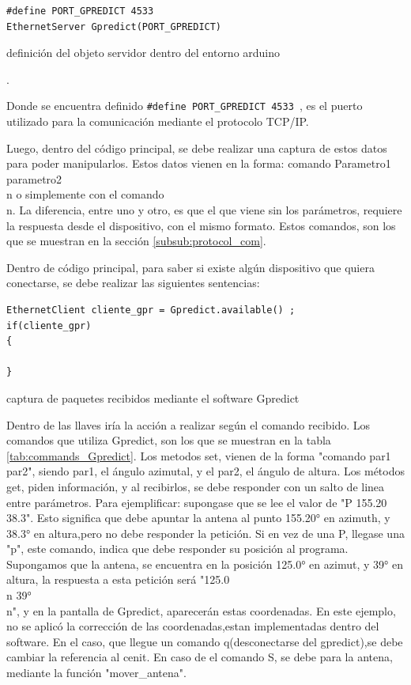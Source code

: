 \begin{listing}[H]
	\begin{verbatim}
#define PORT_GPREDICT 4533 
EthernetServer Gpredict(PORT_GPREDICT)
	\end{verbatim}
\caption{definición del objeto servidor dentro del entorno arduino}. 
\label{cod:obj_serv_gpr}
\end{listing}
Donde se encuentra definido \texttt{#define PORT_GPREDICT 4533 }, es el puerto utilizado para la comunicación mediante el protocolo TCP/IP.

Luego, dentro del código principal, se debe realizar una captura de estos datos para poder manipularlos. Estos datos vienen en la forma: 
comando Parametro1 parametro2\\n o simplemente con el comando \\n. La diferencia, entre uno y otro, es que el que viene sin los parámetros, requiere la respuesta desde el dispositivo, con el mismo formato. Estos comandos, son los que se muestran en la sección \ref{subsub:protocol_com}. 

Dentro de código principal, para saber si existe algún dispositivo que quiera conectarse, se debe realizar las siguientes sentencias: 

\begin{listing}[ht]
	\begin{verbatim}
EthernetClient cliente_gpr = Gpredict.available() ;
if(cliente_gpr)
{

}
	\end{verbatim}
\caption{captura de paquetes recibidos mediante el software Gpredict}
\label{cod:cliente_gpr}
\end{listing}

Dentro de las llaves iría la acción a realizar según el comando recibido. Los comandos que utiliza Gpredict, son los que se muestran en la tabla \ref{tab:commands_Gpredict}. Los metodos set, vienen de la forma "comando par1 par2", siendo par1, el ángulo azimutal, y el par2, el ángulo de altura. Los métodos get, piden información, y al recibirlos, se debe responder con un salto de linea entre parámetros. Para ejemplificar: supongase que se lee el valor de "P 155.20 38.3". Esto significa que debe apuntar la antena al punto 155.20° en azimuth, y 38.3° en altura,pero no debe responder la petición. Si en vez de una P, llegase una "p", este comando, indica que debe responder su posición al programa. Supongamos que la antena, se encuentra en la posición 125.0° en azimut, y 39° en altura, la respuesta a esta petición será "125.0\\n 39°\\n", y en la pantalla de Gpredict, aparecerán estas coordenadas. En este ejemplo, no se aplicó la corrección de las coordenadas,estan implementadas dentro del software. En el caso, que llegue un comando q(desconectarse del gpredict),se debe cambiar la referencia al cenit. En caso de el comando S, se debe para la antena, mediante la función "mover\_antena". 

